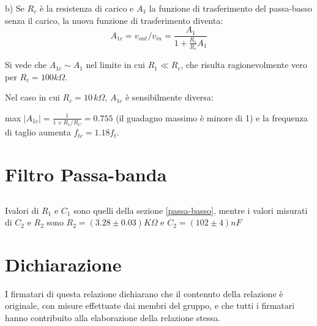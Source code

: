 \documentclass[10pt,a4paper]{article}
\begin{document}
b)  Se $R_c$ è la resistenza di carico e $A_1$ la funzione di trasferimento del passa-basso senza il carico,  la nuova funzione di trasferimento diventa:
\[ A_{1c} = v_{out}/v_{in}= \frac{A_1}{1+\frac{R_1}{R_c}A_1}\]

Si vede che $A_{1c} \sim A_{1}$ nel limite in cui $R_1 \ll R_c$, che risulta ragionevolmente vero per $R_c = 100 k\Omega$.

Nel caso in cui $R_c = 10 \, k\Omega$, $A_{1c}$ è sensibilmente diversa: 

max $|A_{1c}|= \frac{1}{1+R_1/R_C}=0.755$ (il guadagno massimo è minore di 1) e la frequenza di taglio  aumenta $f_{tc}= 1.18 f_{t}$.

\section{Filtro Passa-banda}
\subsection{}
Ivalori di $R_1$ e $C_1$ sono quelli della sezione \ref{passa-basso}, mentre i valori misurati di $C_2$ e $R_2$ sono $R_2  = (3.28 \pm 0.03 )K\Omega$ e  $C_2  = (102\pm 4 )nF$

\section*{Dichiarazione}
I firmatari di questa relazione dichiarano che il contenuto della relazione \`e originale, con misure effettuate dai membri del gruppo, e che tutti i firmatari hanno contribuito alla elaborazione della relazione stessa.
\end{document}
